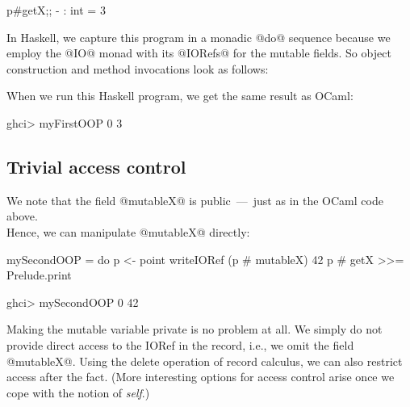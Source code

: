 \begin{code}
 p#getX;;
 - : int = 3
\end{code}

\noindent
In Haskell, we capture this program in a monadic @do@ sequence because
we employ the @IO@ monad with its @IORefs@ for the mutable fields. So
object construction and method invocations look as follows:


\noindent
When we run this Haskell program, we get the same result as OCaml:

\begin{code}
 ghci> myFirstOOP
 0
 3
\end{code}






\subsection{Trivial access control}

\noindent
We note that the field @mutableX@ is public~---~just as in the OCaml
code above.\\
Hence, we can manipulate @mutableX@ directly:

\begin{code}
 mySecondOOP =
  do 
     p <- point
     writeIORef (p # mutableX) 42
     p # getX >>= Prelude.print
\end{code}

\begin{code}
 ghci> mySecondOOP
 0
 42
\end{code}

\noindent
Making the mutable variable private is no problem at all. We simply do
not provide direct access to the IORef in the record, i.e., we omit
the field @mutableX@. Using the delete operation of record calculus,
we can also restrict access after the fact. (More interesting options
for access control arise once we cope with the notion of \emph{self}.)



